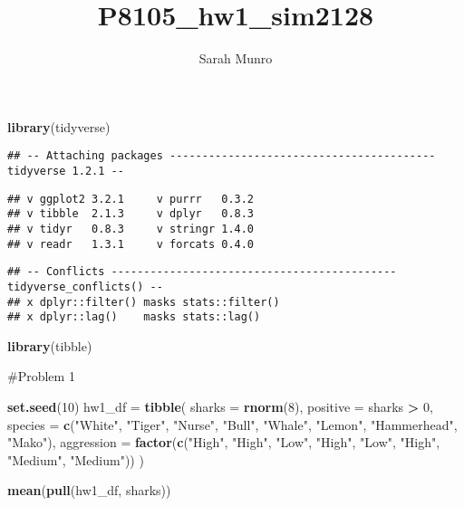 \documentclass[]{article}
\title{P8105\_hw1\_sim2128}
\author{Sarah Munro}
\date{}
\newenvironment{Shaded}{\begin{snugshade}}{\end{snugshade}}
\newcommand{\DataTypeTok}[1]{\textcolor[rgb]{0.13,0.29,0.53}{#1}}
\newcommand{\DecValTok}[1]{\textcolor[rgb]{0.00,0.00,0.81}{#1}}
\newcommand{\KeywordTok}[1]{\textcolor[rgb]{0.13,0.29,0.53}{\textbf{#1}}}
\newcommand{\NormalTok}[1]{#1}
\newcommand{\OperatorTok}[1]{\textcolor[rgb]{0.81,0.36,0.00}{\textbf{#1}}}
\newcommand{\StringTok}[1]{\textcolor[rgb]{0.31,0.60,0.02}{#1}}
\begin{document}
\maketitle

\begin{Shaded}
\begin{Highlighting}[]
\KeywordTok{library}\NormalTok{(tidyverse)}
\end{Highlighting}
\end{Shaded}

\begin{verbatim}
## -- Attaching packages ----------------------------------------- tidyverse 1.2.1 --
\end{verbatim}

\begin{verbatim}
## v ggplot2 3.2.1     v purrr   0.3.2
## v tibble  2.1.3     v dplyr   0.8.3
## v tidyr   0.8.3     v stringr 1.4.0
## v readr   1.3.1     v forcats 0.4.0
\end{verbatim}

\begin{verbatim}
## -- Conflicts -------------------------------------------- tidyverse_conflicts() --
## x dplyr::filter() masks stats::filter()
## x dplyr::lag()    masks stats::lag()
\end{verbatim}

\begin{Shaded}
\begin{Highlighting}[]
\KeywordTok{library}\NormalTok{(tibble)}
\end{Highlighting}
\end{Shaded}

\#Problem 1

\begin{Shaded}
\begin{Highlighting}[]
\KeywordTok{set.seed}\NormalTok{(}\DecValTok{10}\NormalTok{)}
\NormalTok{hw1_df =}\StringTok{ }\KeywordTok{tibble}\NormalTok{(}
  \DataTypeTok{sharks =} \KeywordTok{rnorm}\NormalTok{(}\DecValTok{8}\NormalTok{),}
  \DataTypeTok{positive =}\NormalTok{ sharks }\OperatorTok{>}\StringTok{ }\DecValTok{0}\NormalTok{, }
  \DataTypeTok{species =} \KeywordTok{c}\NormalTok{(}\StringTok{"White"}\NormalTok{, }\StringTok{"Tiger"}\NormalTok{, }\StringTok{"Nurse"}\NormalTok{, }\StringTok{"Bull"}\NormalTok{, }\StringTok{"Whale"}\NormalTok{, }\StringTok{"Lemon"}\NormalTok{, }\StringTok{"Hammerhead"}\NormalTok{,   }\StringTok{"Mako"}\NormalTok{),}
  \DataTypeTok{aggression =} \KeywordTok{factor}\NormalTok{(}\KeywordTok{c}\NormalTok{(}\StringTok{"High"}\NormalTok{, }\StringTok{"High"}\NormalTok{, }\StringTok{"Low"}\NormalTok{, }\StringTok{"High"}\NormalTok{, }\StringTok{"Low"}\NormalTok{, }\StringTok{"High"}\NormalTok{, }\StringTok{"Medium"}\NormalTok{, }\StringTok{"Medium"}\NormalTok{))}
\NormalTok{)}

\KeywordTok{mean}\NormalTok{(}\KeywordTok{pull}\NormalTok{(hw1_df, sharks))}
\end{Highlighting}
\end{Shaded}
\end{document}
